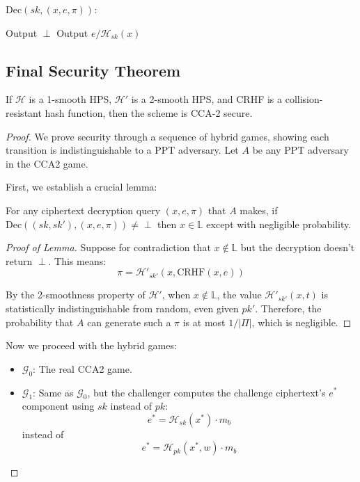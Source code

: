 $\text{Dec}(sk,(x,e,\pi))$:
\begin{algorithmic}
        \State Output $\perp$
    \EndIf
    \State Output $e/\mathcal{H}_{sk}(x)$
\end{algorithmic}
\subsection{Final Security Theorem}

\begin{theorem}
If $\mathcal{H}$ is a 1-smooth HPS, $\mathcal{H}'$ is a 2-smooth HPS, and CRHF is a collision-resistant hash function, then the scheme is CCA-2 secure.
\end{theorem}

\begin{proof}
We prove security through a sequence of hybrid games, showing each transition is indistinguishable to a PPT adversary. Let $A$ be any PPT adversary in the CCA2 game.

First, we establish a crucial lemma:

\begin{lemma}
For any ciphertext decryption query $(x,e,\pi)$ that $A$ makes, if $\text{Dec}((sk,sk'),(x,e,\pi)) \neq \perp$ then $x \in \mathbb{L}$ except with negligible probability.
\end{lemma}

\begin{proof}[Proof of Lemma]
Suppose for contradiction that $x \notin \mathbb{L}$ but the decryption doesn't return $\perp$. This means:
\[ \pi = \mathcal{H}'_{sk'}(x, \text{CRHF}(x,e)) \]

By the 2-smoothness property of $\mathcal{H}'$, when $x \notin \mathbb{L}$, the value $\mathcal{H}'_{sk'}(x,t)$ is statistically indistinguishable from random, even given $pk'$. Therefore, the probability that $A$ can generate such a $\pi$ is at most $1/|\Pi|$, which is negligible.
\end{proof}

Now we proceed with the hybrid games:

\begin{itemize}
    \item $\mathcal{G}_0$: The real CCA2 game.
    
    \item $\mathcal{G}_1$: Same as $\mathcal{G}_0$, but the challenger computes the challenge ciphertext's $e^*$ component using $sk$ instead of $pk$:
    \[ e^* = \mathcal{H}_{sk}(x^*) \cdot m_b \]
    instead of
    \[ e^* = \mathcal{H}_{pk}(x^*,w) \cdot m_b \]
    

\end{itemize}
\end{proof}
